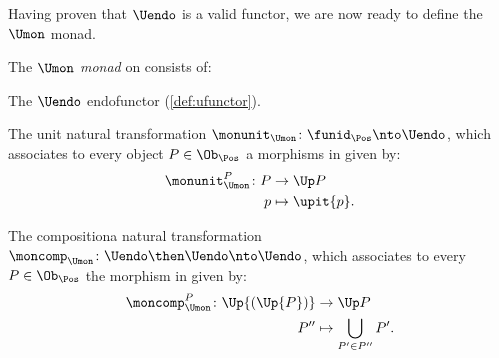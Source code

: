 Having proven that $\Uendo$ is a valid functor, we are now ready to define the $\Umon$ monad.
\begin{definition}
  \label{def:Umon}
  The \emph{$\Umon$ monad} on \Pos consists of:
  \begin{compactenum}
    \item The $\Uendo$ endofunctor (\cref{def:ufunctor}).
    \item The unit natural transformation $\monunit_{\Umon} \colon \funid_{\Pos}\nto \Uendo$, which associates to every object $P\in \Ob_\Pos$ a morphisms in \Pos given by:
    \begin{equation}
      \begin{aligned}
        \monunit_{\Umon}^P\colon P &\to \Up P\\
        p&\mapsto \upit \{p\}.
      \end{aligned}
    \end{equation}
    \item The compositiona natural transformation $\moncomp_{\Umon}\colon \Uendo\then \Uendo\nto \Uendo$, which associates to every $P\in \Ob_\Pos$ the morphism in \Pos given by:
    \begin{equation}
      \begin{aligned}
        \moncomp_{\Umon}^P\colon \Up{(\Up{P})}&\to \Up P\\
        P''&\mapsto \bigcup_{P'\in P''}P'.
      \end{aligned}
    \end{equation}
  \end{compactenum}
\end{definition}



